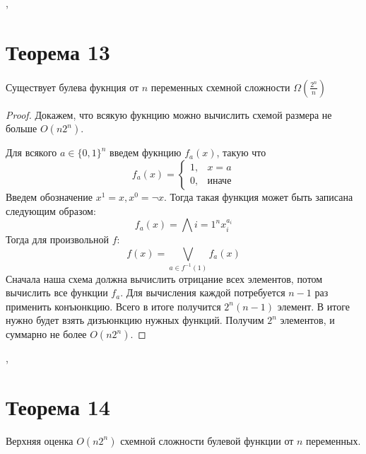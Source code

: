 \documentclass[a4paper,12pt]{article}
\begin{document}
    \sep
    \section {Теорема 13}
    \begin{theorem}
        Существует булева фукнция от $n$ переменных схемной сложности $\Omega(\frac{2^n}{n})$
    \end{theorem}
    \begin{proof}
        Докажем, что всякую фукнцию можно вычислить схемой размера не больше $O(n2^n)$.
        
        Для всякого $a \in \{0, 1\}^n$ введем фукнцию $f_a(x)$, такую что
        \[
        f_a(x) = 
        \begin{cases}
        1, & x = a \\
        0, &\text{иначе}
        \end{cases}
        \]
        Введем обозначение $x^1 = x, x^0 = \lnot x$. Тогда такая функция может быть записана следующим образом:
        \[
        f_a(x) = \bigwedge{i = 1}^n x_i^{a_i}
        \]
        Тогда для произвольной $f$:
        \[
        f(x) = \bigvee_{a \in f^{-1}(1)} f_a(x)
        \]
        Сначала наша схема должна вычислить отрицание всех элементов, потом вычислить все функции $f_a$. Для вычисления каждой потребуется $n - 1$ раз применить конъюнкцию. Всего в итоге получится $2^n(n - 1)$ элемент. В итоге нужно будет взять дизъюнкцию нужных функций. Получим $2^n$ элементов, и суммарно не более $O(n2^n)$. 
        
    \end{proof}
    \sep
 \section{Теорема 14}
\begin{theorem}
    Верхняя оценка $O(n2^n)$ схемной сложности булевой функции от $n$ переменных.
\end{theorem}
\end{document}
